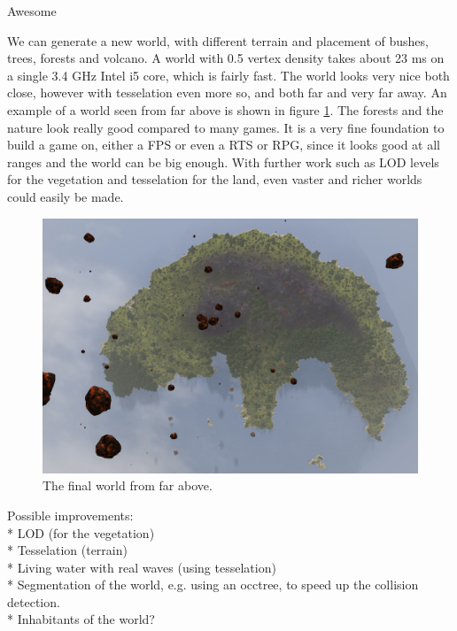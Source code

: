 Awesome

We can generate a new world, with different terrain and placement of bushes, trees, forests and volcano. A world with 0.5 vertex density takes about 23 ms on a single 3.4 GHz Intel i5 core, which is fairly fast. The world looks very nice both close, however with tesselation even more so, and both far and very far away. An example of a world seen from far above is shown in figure \ref{fig:worldFromFarAbove}. The forests and the nature look really good compared to many games. It is a very fine foundation to build a game on, either a FPS or even a RTS or RPG, since it looks good at all ranges and the world can be big enough. With further work such as LOD levels for the vegetation and tesselation for the land, even vaster and richer worlds could easily be made.
\begin{figure}[H]
  \centering
  \includegraphics[width=\linewidth]{images/worldFromAFarTop.jpg}
  \caption{The final world from far above.}
  \label{fig:worldFromFarAbove}
\end{figure}%

Possible improvements:\\
* LOD (for the vegetation)\\
* Tesselation (terrain)\\
* Living water with real waves (using tesselation)\\
* Segmentation of the world, e.g. using an occtree, to speed up the collision detection.\\
* Inhabitants of the world?
















